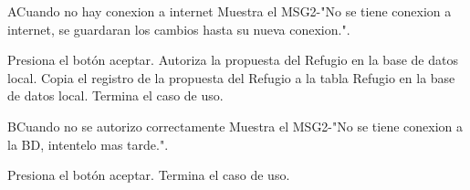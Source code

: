\begin{UCtrayectoriaA}{A}{Cuando no hay conexion a internet}
	\UCpaso Muestra el MSG2-"No se tiene conexion a internet, se guardaran los cambios hasta su nueva conexion.".
	\item\UCactor Presiona el botón aceptar.
	\UCpaso Autoriza la propuesta del Refugio en la base de datos local.	
	\UCpaso Copia el registro de la propuesta del Refugio a la tabla Refugio en la base de datos local.
	\UCpaso[] Termina el caso de uso.
\end{UCtrayectoriaA}

\begin{UCtrayectoriaA}{B}{Cuando no se autorizo correctamente}
	\UCpaso Muestra el MSG2-"No se tiene conexion a la BD, intentelo mas tarde.".
	\item\UCactor Presiona el botón aceptar.
	\UCpaso[] Termina el caso de uso.
\end{UCtrayectoriaA}